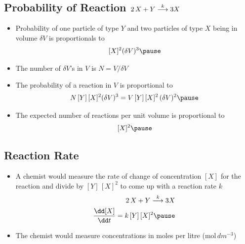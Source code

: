 
\begin{slide}
\section[-2]{Probability of Reaction $2\,X + Y \stackrel{k}{\longrightarrow} 3 X$}

\begin{PauseHighLight}
  \begin{itemize}
  \item Probability of one particle of type $Y$ and two particles of
    type $X$ being in volume $\delta V$ is proportionals to
    \begin{align*}
      [Y]\,[X]^2 (\delta V)^3\pause
    \end{align*}
  \item The number of $\delta V$'s in $V$ is $N=V/\delta V$\pause
  \item The probability of a reaction in $V$ is proportional to
    \begin{align*}
      N\,[Y]\,[X]^2 (\delta V)^3 = V \, [Y]\,[X]^2 \,  (\delta V)^2\pause
    \end{align*}
  \item The expected number of reactions per unit volume is proportional to
    \begin{align*}
      [Y]\,[X]^2\pause
    \end{align*}
  \end{itemize}
\end{PauseHighLight}

\end{slide}


\begin{slide}
\section{Reaction Rate}

\begin{PauseHighLight}
  \begin{itemize}
  \item A chemist would measure the rate of change of concentration
    $[X]$ for the reaction and divide by $[Y]\,[X]^2$ to come up with a
    reaction rate $k$\pause
    \begin{align*}
      2\,X + Y \goesto{k} 3 X \\
      \frac{\dd [X]}{\dd t} = k \, [Y]\,[X]^2\pause
    \end{align*}
  \item The chemist would measure concentrations in moles per litre
    ($\text{mol}\, dm^{-3}$)\pause
  \end{itemize}
\end{PauseHighLight}

\end{slide}

